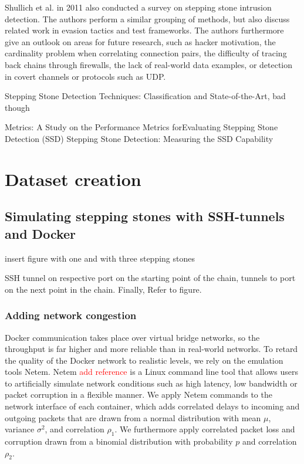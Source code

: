 \documentclass[conference]{IEEEtran}\usepackage[]{graphicx}\usepackage[]{color}
\begin{document}
Shullich et al. \cite{shullich2011survey} in 2011 also conducted a survey on stepping stone intrusion detection. The authors perform a similar grouping of methods, but also discuss related work in evasion tactics and test frameworks. The authors furthermore give an outlook on areas for future research, such as hacker motivation, the cardinality problem when correlating connection pairs, the difficulty of tracing back chains through firewalls, the lack of real-world data examples, or detection in covert channels or protocols such as UDP.  

\cite{almulhem2007survey}

Stepping Stone Detection Techniques: Classification and State-of-the-Art, bad though

Metrics: A Study on the Performance Metrics forEvaluating Stepping Stone Detection (SSD)
Stepping Stone Detection: Measuring the SSD Capability


\section{Dataset creation}

\subsection{Simulating stepping stones with SSH-tunnels and Docker}

insert figure with one and with three stepping stones



SSH tunnel on respective port on the starting point of the chain, tunnels to port on the next point in the chain. Finally, Refer to figure. 

\subsubsection{Adding network congestion}

Docker communication takes place over virtual bridge networks, so the throughput is far higher and more reliable than in real-world networks. %
To retard the quality of the Docker network to realistic levels, we rely on the emulation tools Netem. Netem \textcolor{red}{add reference} is a Linux command line tool that allows users to artificially simulate network conditions such as high latency, low bandwidth or packet corruption in a flexible manner.
We apply Netem commands to the network interface of each container, which adds correlated delays to incoming and outgoing packets that are drawn from a normal distribution with mean $\mu$, variance $\sigma^2$, and correlation $\rho_1$. We furthermore apply correlated packet loss and corruption drawn from a binomial distribution with probability $p$ and correlation $\rho_2$.
\end{document}

